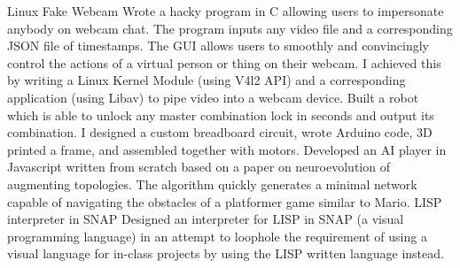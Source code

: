 


\begin{cvskills}

  \vspace{1mm}
  \cvskill 
    {Linux Fake Webcam} %
    {Wrote a hacky program in C allowing users to impersonate anybody on webcam chat. The program inputs any video file and a corresponding JSON file of timestamps. The GUI allows users to smoothly and convincingly control the actions of a virtual person or thing on their webcam. I achieved this by writing a Linux Kernel Module (using V4l2 API) and a corresponding application (using Libav) to pipe video into a webcam device.} %
  \vspace{1mm}
\cvskill
	{} %
	{Built a robot which is able to unlock any master combination lock in seconds and output its combination. I designed a custom breadboard circuit, wrote Arduino code, 3D printed a frame, and assembled together with motors.} %
  \vspace{1mm}
\cvskill
	{}
  {Developed an AI player in Javascript written from scratch based on a paper on neuroevolution of augmenting topologies. The algorithm quickly generates a minimal network capable of navigating the obstacles of a platformer game similar to Mario.}
  \vspace{1mm}
  \cvskill
    {LISP interpreter in SNAP} %
    {Designed an interpreter for LISP in SNAP (a visual programming language) in an attempt to loophole the requirement of using a visual language for in-class projects by using the LISP written language instead.} %
  \vspace{1mm}

\end{cvskills}
\vspace{-5.0mm}
